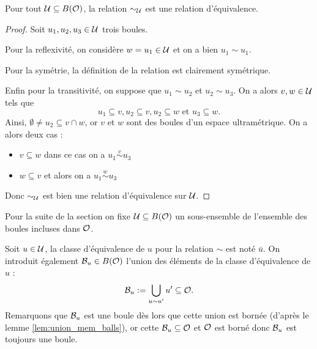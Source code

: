 \documentclass[../../rapport.tex]{subfiles}
\begin{document}
  \begin{proposition}
    Pour tout $\mathcal U \subseteq B(\mathcal{O})$, la relation $\sim_{\mathcal U}$ est une relation d'équivalence.
  \end{proposition}

  \begin{proof}
    Soit $u_1, u_2, u_3 \in \mathcal U$ trois boules.

    Pour la reflexivité, on considère $w = u_1 \in \mathcal U$ et on a bien $u_1 \sim u_1$.

    Pour la symétrie, la définition de la relation est clairement symétrique.

    Enfin pour la transitivité, on suppose que $u_1 \sim u_2$ et $u_2 \sim u_3$.
    On a alors $v, w \in \mathcal U$ tels que
    $$u_1 \subseteq v, u_2 \subseteq v, u_2 \subseteq w \text{ et } u_3 \subseteq w.$$
    Ainsi, $\emptyset \not= u_2 \subseteq v \cap w$, or $v$ et $w$ sont des boules d'un espace ultramétrique. On a alors deux cas :
    \begin{itemize}
      \item $v \subseteq w$ dans ce cas on a $u_1 \stackrel{v}{\sim} u_3$
      \item $w \subseteq v$ et alors on a $u_1 \stackrel{w}{\sim} u_3$
    \end{itemize}
    \begin{figure}[ht]
      \centering
	\hspace{1.5cm}

  \end{figure}
  \pagebreak
  Donc $\sim_{\mathcal U}$ est bien une relation d'équivalence sur $\mathcal U$.
  \end{proof}

  Pour la suite de la section on fixe $\mathcal U \subseteq B(\mathcal{O})$ un sous-ensemble de l'ensemble des boules incluses dans $\mathcal{O}$.

  \begin{definition}
    Soit $u \in \mathcal U$, la classe d'équivalence de $u$ pour la relation $\sim$ est noté $\bar{u}$.
    On introduit également $\mathcal{B}_u \in B(\mathcal{O})$ l'union des éléments de la classe d'équivalence de $u$ :
    $$\mathcal{B}_u := \bigcup_{u \sim u'}{u'} \subseteq \mathcal{O}.$$
    Remarquons que $\mathcal{B}_u$ est une boule dès lors que cette union est bornée (d'après le lemme \ref{lem:union_mem_balls}),
    or cette $\mathcal{B}_u \subseteq \mathcal{O}$ et $\mathcal{O}$ est borné donc $\mathcal{B}_u$ est toujours une boule.
  \end{definition}
\end{document}
